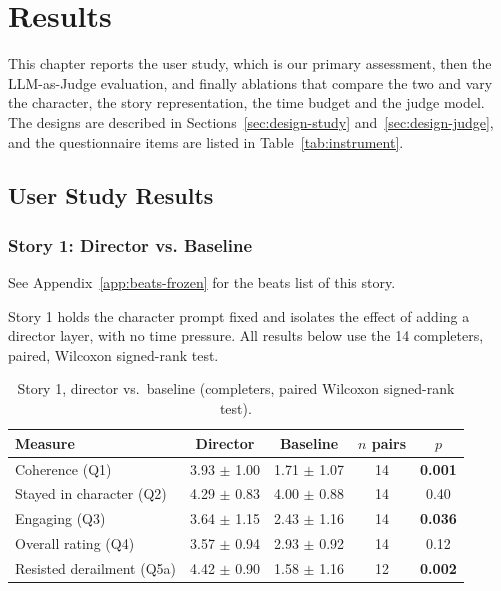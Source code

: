 \chapter{Results}

\label{sec:results}

This chapter reports the user study, which is our primary assessment, then the LLM-as-Judge evaluation, and finally ablations that compare the two and vary the character, the story representation, the time budget and the judge model. The designs are described in Sections~\ref{sec:design-study} and~\ref{sec:design-judge}, and the questionnaire items are listed in Table~\ref{tab:instrument}.

\section{User Study Results}\label{sec:user-study-results}

\subsection{Story 1: Director vs. Baseline}
\label{sec:story1}
See Appendix~\ref{app:beats-frozen} for the beats list of this story.

Story 1 holds the character prompt fixed and isolates the effect of adding a director layer, with no time pressure. All results below use the 14 completers, paired, Wilcoxon signed-rank test.

\begin{table}[htbp]
\centering
\caption{Story 1, director vs.\ baseline (completers, paired Wilcoxon signed-rank test).}
\label{tab:story1}
\begin{tabular}{lcccc}
\toprule
Measure & Director & Baseline & $n$ pairs & $p$ \\
\midrule
Coherence (Q1)              & 3.93 $\pm$ 1.00 & 1.71 $\pm$ 1.07 & 14 & \textbf{0.001} \\
Stayed in character (Q2)    & 4.29 $\pm$ 0.83 & 4.00 $\pm$ 0.88 & 14 & 0.40 \\
Engaging (Q3)                & 3.64 $\pm$ 1.15 & 2.43 $\pm$ 1.16 & 14 & \textbf{0.036} \\
Overall rating (Q4)          & 3.57 $\pm$ 0.94 & 2.93 $\pm$ 0.92 & 14 & 0.12 \\
Resisted derailment (Q5a) & 4.42 $\pm$ 0.90 & 1.58 $\pm$ 1.16 & 12 & \textbf{0.002} \\
\bottomrule
\end{tabular}
\end{table}

